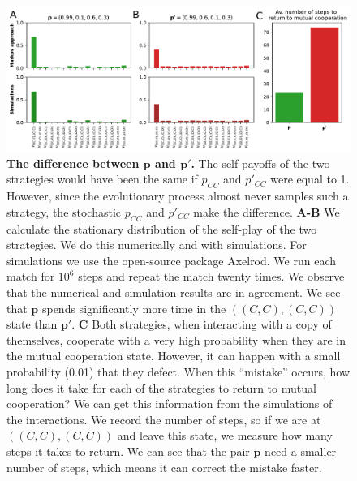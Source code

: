 \documentclass[11pt]{article}
\theoremstyle{plainCl1}
\theoremstyle{plainCl2}
\begin{document}
\begin{figure}
  \centering
  \includegraphics[width=\textwidth]{../../figures/siFigReactiveTwoPayoffs.pdf}
  \caption{\textbf{The difference between \(\mathbf{p}\) and \(\mathbf{p'}\).}
  The self-payoffs of the two strategies would have been the same if \(p_{CC}\)
  and \(p'_{CC}\)
  were equal to 1. However, since the evolutionary process almost never samples
  such a strategy, the stochastic \(p_{CC}\) and \(p'_{CC}\) make the difference.
  {\bf A-B} We
  calculate the stationary distribution of the self-play of the two strategies. We
  do this numerically and with simulations. For simulations we use the open-source
  package Axelrod. We
  run each match for \(10^6\) steps and repeat the match twenty times. We observe
  that the numerical and simulation results are in agreement. We see that
  \(\mathbf{p}\) spends significantly more time in the \(((C, C), (C, C))\) state
  than \(\mathbf{p'}\). 
  {\bf C} Both strategies, when interacting with a copy of themselves, cooperate with a very high
  probability when they are in the mutual cooperation state. However, it can
  happen with a small probability (0.01) that they defect. When
  this ``mistake'' occurs, how long does it take for each of the strategies to
  return to mutual cooperation? We can get this information from the simulations
  of the interactions. We record the number of steps, so if we are at \(((C, C),
  (C, C))\) and leave this state, we measure how many steps it takes to return.
  We can see that the pair \(\mathbf{p}\) need a smaller number of steps,
  which means it can correct the mistake faster.
  }\label{fig:ReactiveTwoPayoffs}
\end{figure}
\end{document}
